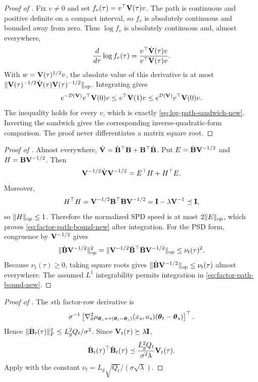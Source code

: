 \begin{proof}[Proof of ]
Fix $v\ne0$ and set $f_v(\tau)=v^\top\mathbf{V}(\tau)v$.  The path is continuous and
positive definite on a compact interval, so $f_v$ is absolutely continuous and
bounded away from zero.  Thus $\log f_v$ is absolutely continuous and, almost
everywhere,
\[
 \frac{d}{d\tau}\log f_v(\tau)
 =\frac{v^\top\dot{\mathbf{V}}(\tau)v}{v^\top\mathbf{V}(\tau)v}.
\]
With $w=\mathbf{V}(\tau)^{1/2}v$, the absolute value of this derivative is at most
$\|\mathbf{V}(\tau)^{-1/2}\dot{\mathbf{V}}(\tau)
\mathbf{V}(\tau)^{-1/2}\|_{\rm op}$.  Integrating gives
\[
 e^{-\mathcal D(\mathbf{V})}v^\top\mathbf{V}(0)v
 \le v^\top\mathbf{V}(1)v
 \le e^{\mathcal D(\mathbf{V})}v^\top\mathbf{V}(0)v.
\]
The inequality holds for every $v$, which is exactly
\eqref{eq:log-path-sandwich-new}.  Inverting the sandwich gives the
corresponding inverse-quadratic-form comparison.  The proof never
differentiates a matrix square root.
\end{proof}

\begin{proof}[Proof of ]
Almost everywhere,
$\dot{\mathbf{V}}=\dot{\mathbf{B}}^\top\mathbf{B}+\mathbf{B}^\top\dot{\mathbf{B}}$.  Put
$E=\dot{\mathbf{B}}\mathbf{V}^{-1/2}$ and $H=\mathbf{B}\mathbf{V}^{-1/2}$.  Then
\[
 \mathbf{V}^{-1/2}\dot{\mathbf{V}}\mathbf{V}^{-1/2}=E^\top H+H^\top E.
\]
Moreover,
\[
 H^\top H
 =\mathbf{V}^{-1/2}\mathbf{B}^\top\mathbf{B}\mathbf{V}^{-1/2}
 =\mathbf{I}-\lambda\mathbf{V}^{-1}\preceq\mathbf{I},
\]
so $\|H\|_{\rm op}\le1$.  Therefore the normalized SPD speed is at most
$2\|E\|_{\rm op}$, which proves \eqref{eq:factor-path-bound-new} after
integration.  For the PSD form, congruence by $\mathbf{V}^{-1/2}$ gives
\[
 \|\dot{\mathbf{B}}\mathbf{V}^{-1/2}\|_{\rm op}^2
 =\|\mathbf{V}^{-1/2}\dot{\mathbf{B}}^\top\dot{\mathbf{B}}\mathbf{V}^{-1/2}\|_{\rm op}
 \le\nu_t(\tau)^2.
\]
Because $\nu_t(\tau)\ge0$, taking square roots gives
$\|\dot{\mathbf{B}}\mathbf{V}^{-1/2}\|_{\rm op}\le\nu_t(\tau)$ almost everywhere.
The assumed $L^1$ integrability permits integration in
\eqref{eq:factor-path-bound-new}.
\end{proof}

\begin{proof}[Proof of ]
The $s$th factor-row derivative is
\[
 \sigma^{-1}\left[
 \nabla_\theta^2\mu_{\boldsymbol{\theta}_s+\tau(\boldsymbol{\theta}_t-\boldsymbol{\theta}_s)}(x_s,a_s)
 (\boldsymbol{\theta}_t-\boldsymbol{\theta}_s)\right]^\top.
\]
Hence
$\|\dot{\mathbf{B}}_t(\tau)\|_F^2\le L_g^2Q_t/\sigma^2$.  Since
$\mathbf{V}_t(\tau)\succeq\lambda\mathbf{I}$,
\[
 \dot{\mathbf{B}}_t(\tau)^\top\dot{\mathbf{B}}_t(\tau)
 \preceq\frac{L_g^2Q_t}{\sigma^2\lambda}\mathbf{V}_t(\tau).
\]
Apply  with the constant
$\nu_t=L_g\sqrt{Q_t}/(\sigma\sqrt\lambda)$.
\end{proof}

